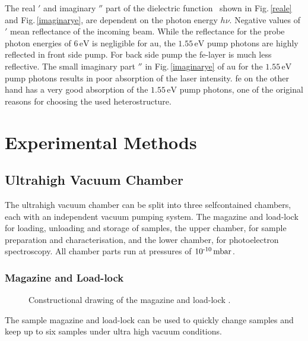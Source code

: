 \documentclass[a4paper,12pt,twoside]{article}
\begin{document}
\noindent
The real \textepsilon$'$ and imaginary \textepsilon$''$ part of the dielectric function \textepsilon\, shown in Fig.\,\ref{reale} and Fig.\,\ref{imaginarye}, are dependent on the photon energy $h\nu$. Negative values of \textepsilon$'$ mean reflectance of the incoming beam. While the reflectance for the probe photon energies of $6\,\mathrm{eV}$ is negligible for \gls{au}, the $1.55\,\mathrm{eV}$ pump photons are highly reflected in front side pump. For back side pump the \gls{fe}-layer is much less reflective. The small imaginary part \textepsilon$''$ in Fig.\,\ref{imaginarye} of \gls{au} for the $1.55\,\mathrm{eV}$ pump photons results in poor absorption of the laser intensity. \gls{fe} on the other hand has a very good absorption of the $1.55\,\mathrm{eV}$ pump photons, one of the original reasons for choosing the used heterostructure.
    \newpage
    
    
    
\section{Experimental Methods}
    \label{EMchap}
    \subsection{Ultrahigh Vacuum Chamber}
    \label{VCchap}
            
The ultrahigh vacuum chamber can be split into three selfcontained chambers, each with an independent vacuum pumping system. The magazine and load-lock for loading, unloading and storage of samples, the upper chamber, for sample preparation and characterisation, and the lower chamber, for photoelectron spectroscopy. All chamber parts run at pressures of $10\textsuperscript{-10}\,\mathrm{mbar}$.
            \subsubsection{Magazine and Load-lock}
                \label{MLLchap}
	\begin{figure}
		\caption{Constructional drawing of the magazine and load-lock  \cite{UB}.}
		    \label{magazin}
	\end{figure}
The sample magazine and load-lock can be used to quickly change samples and keep up to six samples under ultra high vacuum conditions.
\end{document}
